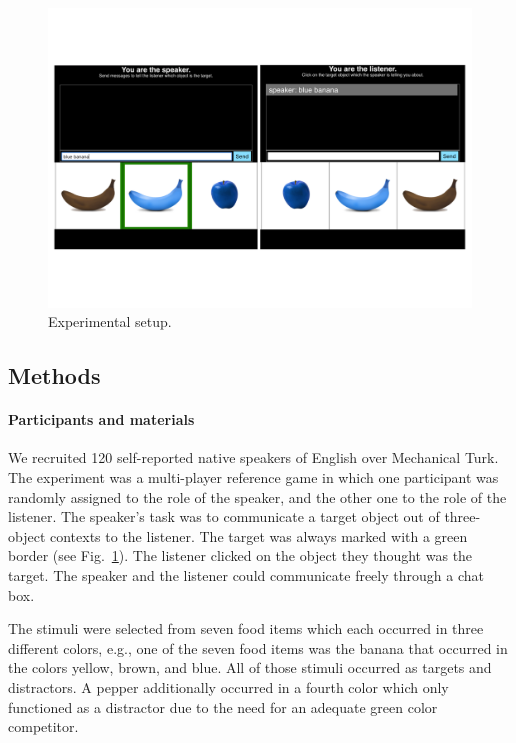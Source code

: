 \documentclass[10pt,letterpaper]{article}
\newcommand{\figref}[1]{Fig.~\ref{#1}}
\begin{document}
\begin{figure}[bt!]
	\centering
	\includegraphics[width=.5\textwidth]{graphs/design_0}
	\caption{Experimental setup.
	}
	\label{fig:mturk}
\end{figure}

\subsection{Methods}

\paragraph{Participants and materials}
We recruited 120 self-reported native speakers of English over Mechanical Turk. The experiment was a multi-player reference game in which one participant was randomly assigned to the role of the speaker, and the other one to the role of the listener. The speaker's task was to communicate a target object out of three-object contexts to the listener. The target was always marked with a green border (see \figref{fig:mturk}). The listener clicked on the object they thought was the target. The speaker and the listener could communicate freely through a chat box.

The stimuli were selected from seven food items which each occurred in three different colors, e.g., one of the seven food items was the banana that occurred in the colors yellow, brown, and blue. All of those stimuli occurred as targets and distractors. A pepper additionally occurred in a fourth color which only functioned as a distractor due to the need for an adequate green color competitor.
\end{document}
